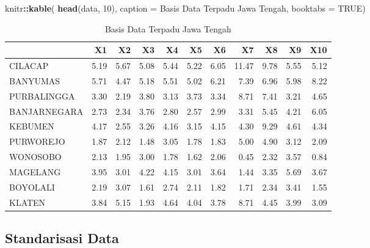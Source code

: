 \documentclass[
  oneside]{book}
\newenvironment{Shaded}{\begin{snugshade}}{\end{snugshade}}
\newcommand{\AttributeTok}[1]{\textcolor[rgb]{0.13,0.29,0.53}{#1}}
\newcommand{\ConstantTok}[1]{\textcolor[rgb]{0.56,0.35,0.01}{#1}}
\newcommand{\DecValTok}[1]{\textcolor[rgb]{0.00,0.00,0.81}{#1}}
\newcommand{\FunctionTok}[1]{\textcolor[rgb]{0.13,0.29,0.53}{\textbf{#1}}}
\newcommand{\NormalTok}[1]{#1}
\newcommand{\SpecialCharTok}[1]{\textcolor[rgb]{0.81,0.36,0.00}{\textbf{#1}}}
\newcommand{\StringTok}[1]{\textcolor[rgb]{0.31,0.60,0.02}{#1}}
\begin{document}
\begin{Shaded}
\begin{Highlighting}[]
\NormalTok{knitr}\SpecialCharTok{::}\FunctionTok{kable}\NormalTok{(}
  \FunctionTok{head}\NormalTok{(data, }\DecValTok{10}\NormalTok{), }\AttributeTok{caption =} \StringTok{\textquotesingle{}Basis Data Terpadu Jawa Tengah\textquotesingle{}}\NormalTok{,}
  \AttributeTok{booktabs =} \ConstantTok{TRUE}\NormalTok{)}
\end{Highlighting}
\end{Shaded}

\begin{table}

\caption{\label{tab:nice-tab-2}Basis Data Terpadu Jawa Tengah}
\centering
\begin{tabular}[t]{lrrrrrrrrrr}
\toprule
  & X1 & X2 & X3 & X4 & X5 & X6 & X7 & X8 & X9 & X10\\
\midrule
CILACAP & 5.19 & 5.67 & 5.08 & 5.44 & 5.22 & 6.05 & 11.47 & 9.78 & 5.55 & 5.12\\
BANYUMAS & 5.71 & 4.47 & 5.18 & 5.51 & 5.02 & 6.21 & 7.39 & 6.96 & 5.98 & 8.22\\
PURBALINGGA & 3.30 & 2.19 & 3.80 & 3.13 & 3.73 & 3.34 & 8.71 & 7.41 & 3.21 & 4.65\\
BANJARNEGARA & 2.73 & 2.34 & 3.76 & 2.80 & 2.57 & 2.99 & 3.31 & 5.45 & 4.21 & 6.05\\
KEBUMEN & 4.17 & 2.55 & 3.26 & 4.16 & 3.15 & 4.15 & 4.30 & 9.29 & 4.61 & 4.34\\
\addlinespace
PURWOREJO & 1.87 & 2.12 & 1.48 & 3.05 & 1.78 & 1.83 & 5.00 & 4.90 & 3.12 & 2.09\\
WONOSOBO & 2.13 & 1.95 & 3.00 & 1.78 & 1.62 & 2.06 & 0.45 & 2.32 & 3.57 & 0.84\\
MAGELANG & 3.95 & 3.01 & 4.22 & 4.15 & 3.01 & 3.64 & 1.44 & 3.35 & 5.69 & 3.67\\
BOYOLALI & 2.19 & 3.07 & 1.61 & 2.74 & 2.11 & 1.82 & 1.71 & 2.34 & 3.41 & 1.55\\
KLATEN & 3.84 & 5.15 & 1.93 & 4.64 & 4.04 & 3.78 & 8.71 & 4.45 & 3.99 & 3.09\\
\bottomrule
\end{tabular}
\end{table}

\subsection*{Standarisasi Data}\label{standarisasi-data}
\end{document}
